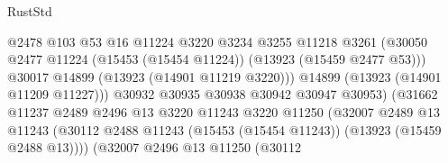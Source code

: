 \begin{lexlean}{RustStd}
\begin{coremodule}
                                              @2478
                                              @103
                                              @53
                                              @16
                                              @11224
                                              @3220
                                              @3234
                                              @3255
                                              @11218
                                              @3261
                                              (@30050
                                                @2477
                                                @11224
                                                (@15453 (@15454 @11224))
                                                (@13923 (@15459 @2477 @53)))
                                              @30017
                                              @14899
                                              (@13923 (@14901 @11219 @3220)))
                                            @14899
                                            (@13923 (@14901 @11209 @11227)))
                                          @30932
                                          @30935
                                          @30938
                                          @30942
                                          @30947
                                          @30953)
                                        (@31662
                                          @11237
                                          @2489
                                          @2496
                                          @13
                                          @3220
                                          @11243
                                          @3220
                                          @11250
                                          (@32007
                                            @2489
                                            @13
                                            @11243
                                            (@30112
                                              @2488
                                              @11243
                                              (@15453 (@15454 @11243))
                                              (@13923 (@15459 @2488 @13))))
                                          (@32007
                                            @2496
                                            @13
                                            @11250
                                            (@30112

\end{coremodule}
\end{lexlean}

